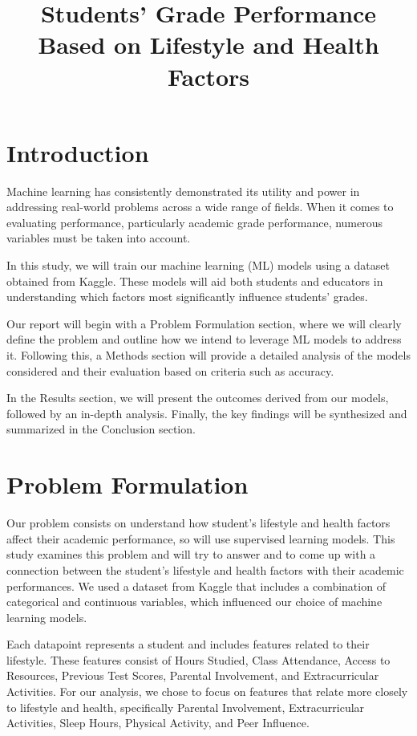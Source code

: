 \documentclass{article}
\title{Students' Grade Performance Based on Lifestyle and Health Factors}
\begin{document}
\maketitle

\section{Introduction}
\quad Machine learning has consistently demonstrated its utility and power in addressing real-world problems across a wide range of fields. When it comes to evaluating performance, particularly academic grade performance, numerous variables must be taken into account.

In this study, we will train our machine learning (ML) models using a dataset obtained from Kaggle. These models will aid both students and educators in understanding which factors most significantly influence students' grades.

Our report will begin with a Problem Formulation section, where we will clearly define the problem and outline how we intend to leverage ML models to address it. Following this, a Methods section will provide a detailed analysis of the models considered and their evaluation based on criteria such as accuracy.

In the Results section, we will present the outcomes derived from our models, followed by an in-depth analysis. Finally, the key findings will be synthesized and summarized in the Conclusion section.

\section{Problem Formulation}
\quad Our problem consists on understand how student's lifestyle and health factors affect their academic performance, so will use supervised learning models.
This study examines this problem and will try to answer and to come up with a connection between the student's lifestyle and health factors with their academic performances. We used a dataset from Kaggle \cite{Kaggle_dataset} that includes a combination of categorical and continuous variables, which influenced our choice of machine learning models.


Each datapoint represents a student and includes features related to their lifestyle. These features consist of Hours Studied, Class Attendance, Access to Resources, Previous Test Scores, Parental Involvement, and Extracurricular Activities. For our analysis, we chose to focus on features that relate more closely to lifestyle and health, specifically Parental Involvement, Extracurricular Activities, Sleep Hours, Physical Activity, and Peer Influence.
\end{document}
